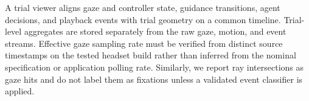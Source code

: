 \documentclass[11pt,letterpaper]{article}
\begin{document}
A trial viewer aligns gaze and controller state, guidance transitions, agent decisions, and playback events with trial geometry on a common timeline. Trial-level aggregates are stored separately from the raw gaze, motion, and event streams. Effective gaze sampling rate must be verified from distinct source timestamps on the tested headset build rather than inferred from the nominal specification or application polling rate. Similarly, we report ray intersections as gaze hits and do not label them as fixations unless a validated event classifier is applied.


\end{document}

